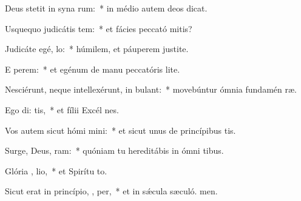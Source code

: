 \item Deus stetit in syna rum:~* in médio autem deos dicat.
\item Usquequo judicátis tem:~* et fácies peccató mitis?
\item Judicáte egé,  lo:~* húmilem, et páuperem justite.
\item E perem:~* et egénum de manu peccatóris lite.
\item Nesciérunt, neque intellexérunt, in  bulant:~* movebúntur ómnia fundamén ræ.
\item Ego di:  tis,~* et fílii Excél nes.
\item Vos autem sicut hómi mini:~* et sicut unus de princípibus tis.
\item Surge, Deus,  ram:~* quóniam tu hereditábis in ómni tibus.
\item Glória ,  lio,~* et Spirítu to.
\item Sicut erat in princípio,  ,  per,~* et in sǽcula sæculó. men.
